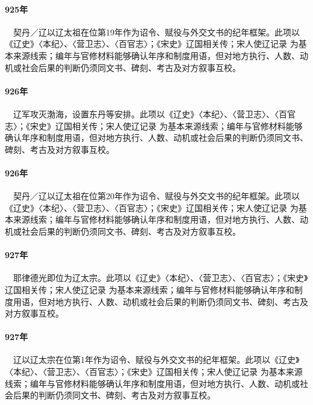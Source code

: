 \paragraph{925年}　契丹／辽以辽太祖在位第19年作为诏令、赋役与外交文书的纪年框架。此项以《辽史》〈本纪〉、〈营卫志〉、〈百官志〉；《宋史》辽国相关传；宋人使辽记录 为基本来源线索；编年与官修材料能够确认年序和制度用语，但对地方执行、人数、动机或社会后果的判断仍须同文书、碑刻、考古及对方叙事互校。

\paragraph{926年}　辽军攻灭渤海，设置东丹等安排。此项以《辽史》〈本纪〉、〈营卫志〉、〈百官志〉；《宋史》辽国相关传；宋人使辽记录 为基本来源线索；编年与官修材料能够确认年序和制度用语，但对地方执行、人数、动机或社会后果的判断仍须同文书、碑刻、考古及对方叙事互校。

\paragraph{926年}　契丹／辽以辽太祖在位第20年作为诏令、赋役与外交文书的纪年框架。此项以《辽史》〈本纪〉、〈营卫志〉、〈百官志〉；《宋史》辽国相关传；宋人使辽记录 为基本来源线索；编年与官修材料能够确认年序和制度用语，但对地方执行、人数、动机或社会后果的判断仍须同文书、碑刻、考古及对方叙事互校。

\paragraph{927年}　耶律德光即位为辽太宗。此项以《辽史》〈本纪〉、〈营卫志〉、〈百官志〉；《宋史》辽国相关传；宋人使辽记录 为基本来源线索；编年与官修材料能够确认年序和制度用语，但对地方执行、人数、动机或社会后果的判断仍须同文书、碑刻、考古及对方叙事互校。

\paragraph{927年}　辽以辽太宗在位第1年作为诏令、赋役与外交文书的纪年框架。此项以《辽史》〈本纪〉、〈营卫志〉、〈百官志〉；《宋史》辽国相关传；宋人使辽记录 为基本来源线索；编年与官修材料能够确认年序和制度用语，但对地方执行、人数、动机或社会后果的判断仍须同文书、碑刻、考古及对方叙事互校。

